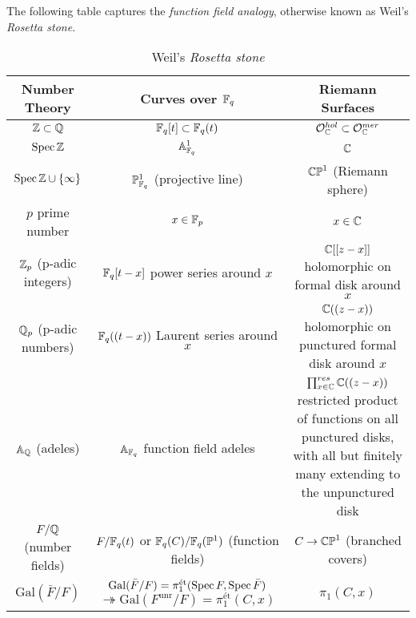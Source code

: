 The following table \cite{Yoo18} \cite{nlab:function_field_analogy} captures the \emph{function field analogy}, otherwise known as Weil's \emph{Rosetta stone}. 
\begin{table}[h!]
	\centering
\begin{tabular}{|c|c|c|}
	\hline
	Number Theory & Curves over $\mathbb{F}_q$ & Riemann Surfaces\\
	\hline
	\hline
	$\mathbb{Z} \subset \mathbb{Q}$ & $\mathbb{F}_q[t] \subset \mathbb{F}_q(t)$ & $\mathcal O^{hol}_{\mathbb{C}} \subset \mathcal O^{mer}_{\mathbb{C}}$ \\
	\hline
	$\mathrm{Spec}\, \mathbb{Z}$ & $\mathbb A^1_{\mathbb{F}_q}$ & $\mathbb{C}$\\
	\hline
	$\mathrm{Spec}\, \mathbb{Z} \cup \{\infty\}$ & $\mathbb P^1_{\mathbb{F}_q}$ (projective line) & $\mathbb{CP}^1$ (Riemann sphere)\\
	\hline
	$p$ prime number & $x \in \mathbb{F}_p$ & $x \in \mathbb{C}$\\
	\hline
	\hline
	$\mathbb{Z}_p$ (p-adic integers) & $\mathbb{F}_q[t-x]$ power series around $x$ & \parbox{6cm}{\vspace{0.1in} $\mathbb{C}[[z-x]]$ holomorphic on formal disk around $x$\vspace{0.1in}}\\
	\hline
	$\mathbb{Q}_p$ (p-adic numbers) & $\mathbb{F}_q((t-x))$ Laurent series around $x$ & \parbox{6cm}{\vspace{0.1in} $\mathbb{C}((z-x))$ holomorphic on punctured formal disk around $x$\vspace{0.1in} }\\
	\hline
	$\mathbb A_{\mathbb{Q}}$ (adeles) & $\mathbb A_{\mathbb{F}_q}$ function field adeles & \parbox{6cm}{\vspace{0.1in} $\prod_{x \in \mathbb{C}}^{res} \mathbb{C}((z-x))$ restricted product of functions on all punctured disks, with all but finitely many extending to the unpunctured disk\vspace{0.1in} }\\
	\hline
	\hline
	$F/\mathbb{Q}$ (number fields) & \parbox{5cm}{$F/\mathbb{F}_q(t)$ or $\mathbb{F}_q(C)/\mathbb{F}_q(\mathbb P^1)$\\(function fields)}& $C \to \mathbb{CP}^1$ (branched covers)\\
	\hline
	$\mathrm{Gal}(\bar F/F)$ & \parbox{6cm}{$\mathrm{Gal}(\bar F/F) = \pi_1^{\text{\'et}}(\mathrm{Spec}\, F, \mathrm{Spec}\, \bar F)$\\
	$\twoheadrightarrow \mathrm{Gal}(F^{\text{unr}}/F) = \pi_1^{\text{\'et}}(C, x)$} & $\pi_1(C, x)$\\
	\hline
	
	\hline
\end{tabular}
\caption{Weil's \emph{Rosetta stone}}
\label{table:rosetta}
\end{table}
